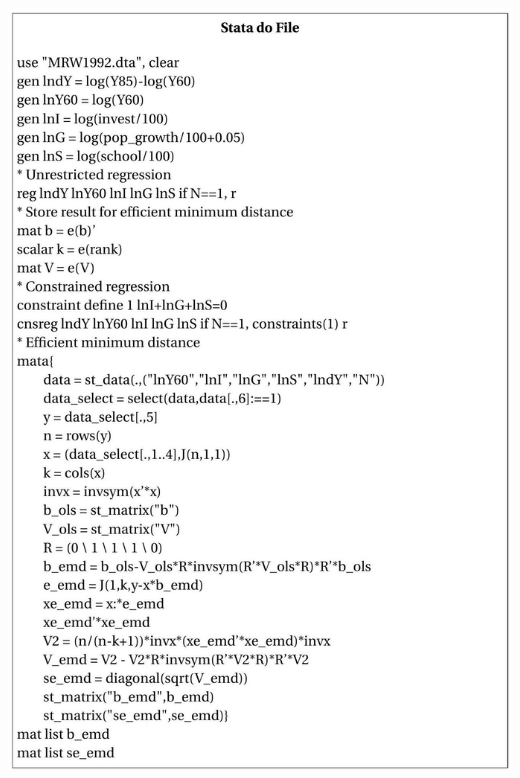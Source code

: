 \documentclass[10pt]{article}
\begin{document}
\includegraphics[max width=\textwidth]{2022_09_17_fb390717b501da243396g-15}
\end{document}
